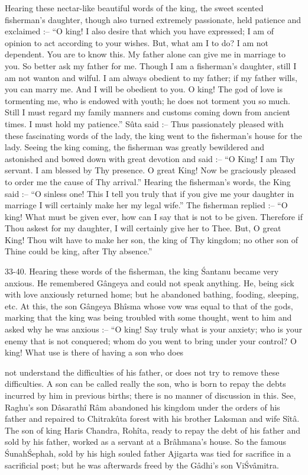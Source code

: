 Hearing these nectar-like beautiful words of the king, the sweet scented fisherman's daughter, though also turned extremely passionate, held patience and exclaimed :-- ``O king! I also desire that which you have expressed; I am of opinion to act according to your wishes. But, what am I to do? I am not dependent. You are to know this. My father alone can give me in marriage to you. So better ask my father for me. Though I am a fisherman's daughter, still I am not wanton and wilful. I am always obedient to my father; if my father wills, you can marry me. And I will be obedient to you. O king! The god of love is tormenting me, who is endowed with youth; he does not torment you so much. Still I must regard my family manners and customs coming down from ancient times. I must hold my patience.'' S\^uta said :-- Thus passionately pleased with these fascinating words of the lady, the king went to the fisherman's house for the lady. Seeing the king coming, the fisherman was greatly bewildered and astonished and bowed down with great devotion and said :-- ``O King! I am Thy servant. I am blessed by Thy presence. O great King! Now be graciously pleased to order me the cause of Thy arrival.'' Hearing the fisherman's words, the King said :-- ``O sinless one! This I tell you truly that if you give me your daughter in marriage I will certainly make her my legal wife.'' The fisherman replied :-- ``O king! What must be given ever, how can I say that is not to be given. Therefore if Thou askest for my daughter, I will certainly give her to Thee. But, O great King! Thou wilt have to make her son, the king of Thy kingdom; no other son of Thine could be king, after Thy absence.''

33-40. Hearing these words of the fisherman, the king \'Santanu became very anxious. He remembered G\^angeya and could not speak anything. He, being sick with love anxiously returned home; but he abandoned bathing, fooding, sleeping, etc. At this, the son G\^angeya Bh\^isma whose vow was equal to that of the gods, marking that the king was being troubled with some thought, went to him and asked why he was anxious :-- ``O king! Say truly what is your anxiety; who is your enemy that is not conquered; whom do you went to bring under your control? O king! What use is there of having a son who does

not understand the difficulties of his father, or does not try to remove these difficulties. A son can be called really the son, who is born to repay the debts incurred by him in previous births; there is no manner of discussion in this. See, Raghu's son D\^asarath\^i R\^am abandoned his kingdom under the orders of his father and repaired to Chitrak\^uta forest with his brother Laksman and wife S\^it\^a. The son of king Haris Chandra, Roh\^ita, ready to repay the debt of his father and sold by his father, worked as a servant at a Br\^ahmana's house. So the famous \'Sunah\'Sephah, sold by his high souled father Ajigarta was tied for sacrifice in a sacrificial post; but he was afterwards freed by the G\^adhi's son Vi\'Sv\^amitra.

